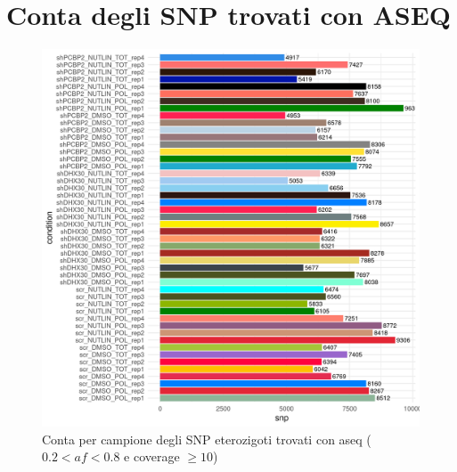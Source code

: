 \section{Conta degli SNP trovati con ASEQ}
\label{sec:snp_count}
 \begin{figure}[H]
   \centering
   \includegraphics[scale=1]{aseq_count_2_8_10_pre.png}
	 \caption{Conta per campione degli SNP eterozigoti trovati con aseq ($0.2< af < 0.8$ e coverage $\ge 10$)}
   \label{fig:proj_pipeline}
 \end{figure}

